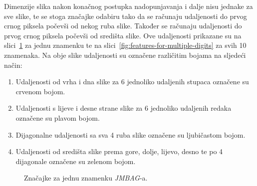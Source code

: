 Dimenzije slika nakon konačnog postupka nadopunjavanja i dalje nisu jednake za sve slike, te se stoga značajke odabiru
tako da se računaju udaljenosti do prvog crnog piksela počevši od nekog ruba slike. Također se računaju udaljenosti do
prvog crnog piksela počevši od središta slike. Ove udaljenosti prikazane su na
slici\ \ref{fig:features-for-single-digit} za jednu znamenku te na slici\ \ref{fig:features-for-multiple-digits} za svih
10 znamenaka. Na obje slike udaljenosti su označene različitim bojama na sljedeći način:
\begin{enumerate}
    \item Udaljenosti od vrha i dna slike za 6 jednoliko udaljenih stupaca označene su crvenom bojom.
    \item Udaljenosti s lijeve i desne strane slike za 6 jednoliko udaljenih redaka označene su plavom bojom.
    \item Dijagonalne udaljenosti sa sva 4 ruba slike označene su ljubičastom bojom.
    \item Udaljenosti od središta slike prema gore, dolje, lijevo, desno te po 4 dijagonale označene su zelenom bojom.
\end{enumerate}
\begin{figure}[htb]
    \centering
    \caption{Značajke za jednu znamenku \emph{JMBAG}-a.}
    \label{fig:features-for-single-digit}
\end{figure}
